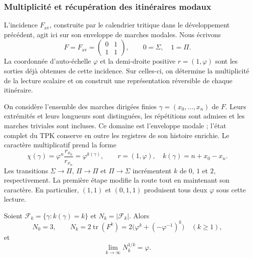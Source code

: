 \subsubsection{Multiplicité et récupération des itinéraires modaux}
\label{corpus9:modal:multiplicidad}

L'incidence \(F_{\mathrm{av}}\), construite par le calendrier tritique
dans le développement précédent, agit ici sur son enveloppe de marches
modales. Nous écrivons
\[
 F=F_{\mathrm{av}}=\begin{pmatrix}0&1\\1&1\end{pmatrix},
 \qquad 0=\Sigma,\quad 1=\Pi.
\]
La coordonnée d'auto-échelle \(\varphi\) et la demi-droite positive
\(r=(1,\varphi)\) sont les sorties déjà obtenues de cette incidence.
Sur celles-ci, on détermine la multiplicité de la lecture scalaire et
on construit une représentation réversible de chaque itinéraire.

On considère l'ensemble des marches dirigées finies
\(\gamma=(x_0,\ldots,x_n)\) de \(F\). Leurs extrémités
et leurs longueurs sont distinguées, les répétitions sont admises et les marches triviales sont incluses.
Ce domaine est l'enveloppe modale ; l'état complet du TPK
conserve en outre les registres de son histoire enrichie.
Le caractère multiplicatif prend la forme
\begin{equation}
 \chi(\gamma)=\varphi^n\frac{r_{x_0}}{r_{x_n}}
             =\varphi^{k(\gamma)},\qquad
 r=(1,\varphi),\quad k(\gamma)=n+x_0-x_n.
 \label{corpus9:modal:caracter}
\end{equation}
Les transitions \(\Sigma\to\Pi\), \(\Pi\to\Pi\) et
\(\Pi\to\Sigma\) incrémentent \(k\) de \(0\), \(1\) et \(2\),
respectivement. La première étape modifie la route tout en maintenant son
caractère. En particulier, \((1,1)\) et \((0,1,1)\) produisent tous deux
\(\varphi\) sous cette lecture.

\begin{proposition}
\label{corpus9:modal:conteo}
Soient \(\mathcal F_k=\{\gamma:k(\gamma)=k\}\) et
\(N_k=|\mathcal F_k|\). Alors
\begin{equation}
 N_0=3,\qquad
 N_k=2\operatorname{tr}(F^k)
     =2\bigl(\varphi^k+(-\varphi^{-1})^k\bigr)
     \quad(k\geq1),
 \label{corpus9:modal:multiplicidad-exacta}
\end{equation}
et
\[
 \lim_{k\to\infty}N_k^{1/k}=\varphi.
\]
\end{proposition}

